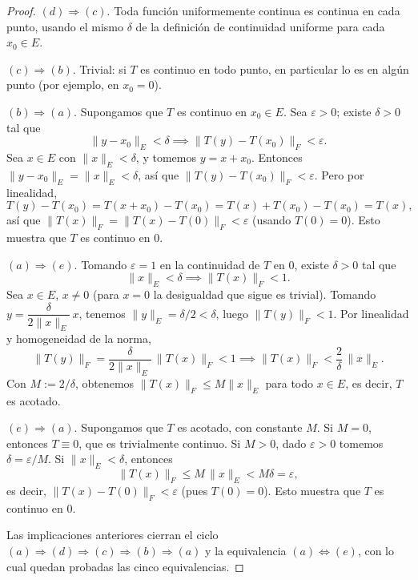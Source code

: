 \begin{proof}
\medskip

$(d)\Rightarrow(c)$. Toda función uniformemente continua es continua
en cada punto, usando el mismo $\delta$ de la definición de
continuidad uniforme para cada $x_0\in E$.

\medskip

$(c)\Rightarrow(b)$. Trivial: si $T$ es continuo en todo punto, en
particular lo es en algún punto (por ejemplo, en $x_0=0$).

\medskip

$(b)\Rightarrow(a)$. Supongamos que $T$ es continuo en $x_0\in E$. Sea
$\varepsilon>0$; existe $\delta>0$ tal que
\[
\|y-x_0\|_E<\delta \implies \|T(y)-T(x_0)\|_F<\varepsilon.
\]
Sea $x\in E$ con $\|x\|_E<\delta$, y tomemos $y=x+x_0$. Entonces
$\|y-x_0\|_E=\|x\|_E<\delta$, así que $\|T(y)-T(x_0)\|_F<\varepsilon$.
Pero por linealidad,
\[
T(y)-T(x_0) = T(x+x_0)-T(x_0) = T(x)+T(x_0)-T(x_0) = T(x),
\]
así que $\|T(x)\|_F=\|T(x)-T(0)\|_F<\varepsilon$ (usando $T(0)=0$).
Esto muestra que $T$ es continuo en $0$.

\medskip

$(a)\Rightarrow(e)$. Tomando $\varepsilon=1$ en la continuidad de $T$
en $0$, existe $\delta>0$ tal que
\[
\|x\|_E<\delta \implies \|T(x)\|_F<1.
\]
Sea $x\in E$, $x\ne0$ (para $x=0$ la desigualdad que sigue es
trivial). Tomando $y=\dfrac{\delta}{2\|x\|_E}\,x$, tenemos
$\|y\|_E=\delta/2<\delta$, luego $\|T(y)\|_F<1$. Por linealidad y
homogeneidad de la norma,
\[
\|T(y)\|_F = \frac{\delta}{2\|x\|_E}\,\|T(x)\|_F < 1
\implies \|T(x)\|_F < \frac{2}{\delta}\,\|x\|_E.
\]
Con $M:=2/\delta$, obtenemos $\|T(x)\|_F\le M\|x\|_E$ para todo
$x\in E$, es decir, $T$ es acotado.

\medskip

$(e)\Rightarrow(a)$. Supongamos que $T$ es acotado, con constante $M$.
Si $M=0$, entonces $T\equiv 0$, que es trivialmente continuo. Si
$M>0$, dado $\varepsilon>0$ tomemos $\delta=\varepsilon/M$. Si
$\|x\|_E<\delta$, entonces
\[
\|T(x)\|_F \le M\,\|x\|_E < M\delta = \varepsilon,
\]
es decir, $\|T(x)-T(0)\|_F<\varepsilon$ (pues $T(0)=0$). Esto muestra
que $T$ es continuo en $0$.

\medskip

Las implicaciones anteriores cierran el ciclo $(a)\Rightarrow(d)
\Rightarrow(c)\Rightarrow(b)\Rightarrow(a)$ y la equivalencia
$(a)\Leftrightarrow(e)$, con lo cual quedan probadas las cinco
equivalencias.
\end{proof}
